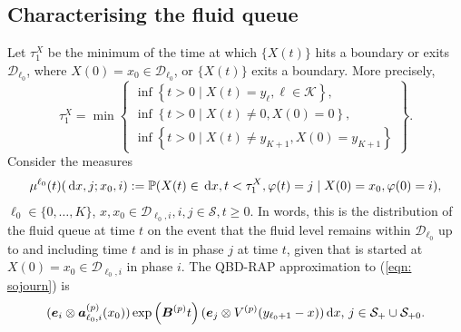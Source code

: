 \subsection{Characterising the fluid queue}
Let \(\tau_1^X\) be the minimum of the time at which \(\{X(t)\}\) hits a boundary or exits \(\mathcal D_{\ell_0}\), where \(X(0)=x_0\in\mathcal D_{\ell_0}\), or \(\{X(t)\}\) exits a boundary. More precisely, 
\[\tau_1^X = \min\left\{\begin{array}{c}\inf\left\{t>0\mid X(t)=y_{\ell}, \ell\in\mathcal K\right\}, \\ \inf\left\{t>0 \mid X(t) \neq 0, X(0)=0\right\}, \\ \inf\left\{t>0 \mid X(t) \neq y_{K+1}, X(0)=y_{K+1}\right\} \end{array} \right\}.\]
Consider the measures 
\begin{align}\label{eqn: sojourn}
	\mu^{\ell_0}(t)(\, \mathrm{d} x,j; x_0,i) := \mathbb P(X(t)\in \, \mathrm{d} x, t<\tau_1^X, \varphi(t) = j \mid X(0) = x_0, \varphi(0) = i),
\end{align}
\(\ell_0\in\{0,\dots,K\}\), \(x,x_0 \in\mathcal D_{\ell_0,i}, i,j\in\mathcal S, t \geq 0. \)
In words, this is the distribution of the fluid queue at time \(t\) on the event that the fluid level remains within \(\mathcal D_{\ell_0}\) up to and including time \(t\) and is in phase \(j\) at time \(t\), given that is started at \(X(0)=x_0\in\mathcal D_{\ell_0,i}\) in phase \(i\). The QBD-RAP approximation to (\ref{eqn: sojourn}) is 
\begin{align}
	(\boldsymbol e_i\otimes \boldsymbol  a_{\ell_0,i}^{(p)}(x_0)) \exp\left(\boldsymbol{B}^{(p)}t\right)(\boldsymbol e_j \otimes V^{(p)}(y_{\ell_0+1}-x))\, \mathrm{d} x,\,j\in\mathcal{S}_+\cup\mathcal{S}_{+0}. \label{eqn: ldll}
\end{align}
